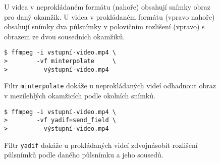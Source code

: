 \begingroup
\begin{subfigure}{\linewidth}

\vspace{-10pt}
\caption{}
\end{subfigure}
%
\par\vspace{10pt}%
\begin{subfigure}[t]{0.49\linewidth}

\caption{U videa v neprokládaném formátu (nahoře) obsahují snímky obraz pro daný okamžik. U videa v prokládaném formátu (vpravo nahoře) obsahují snímky dva půlsnímky v polovičním rozlišení (vpravo) s obrazem ze dvou sousedních okamžiků.}
\end{subfigure}\hfill
\begin{subfigure}[t]{0.49\linewidth}

\par\vspace{8pt}%

\end{subfigure}
\par\vspace{10pt}%
\begin{subfigure}[t]{0.49\linewidth}
\begin{verbatim}
$ ffmpeg -i vstupní-video.mp4 \
>        -vf minterpolate     \
>          výstupní-video.mp4
\end{verbatim}

\caption{Filtr \texttt{minterpolate} dokáže u neprokládaných videí odhadnout obraz v mezilehlých okamžicích podle okolních snímků.\footnotemark}
\end{subfigure}\hfill
\begin{subfigure}[t]{0.49\linewidth}
\begin{verbatim}
$ ffmpeg -i vstupní-video.mp4 \
>        -vf yadif=send_field \
>          výstupní-video.mp4
\end{verbatim}

\caption{Filtr \texttt{yadif} dokáže u prokládaných videí zdvojnásobit rozlišení půlsnímků podle daného půlsnímku a jeho sousedů.}
\end{subfigure}
\endgroup